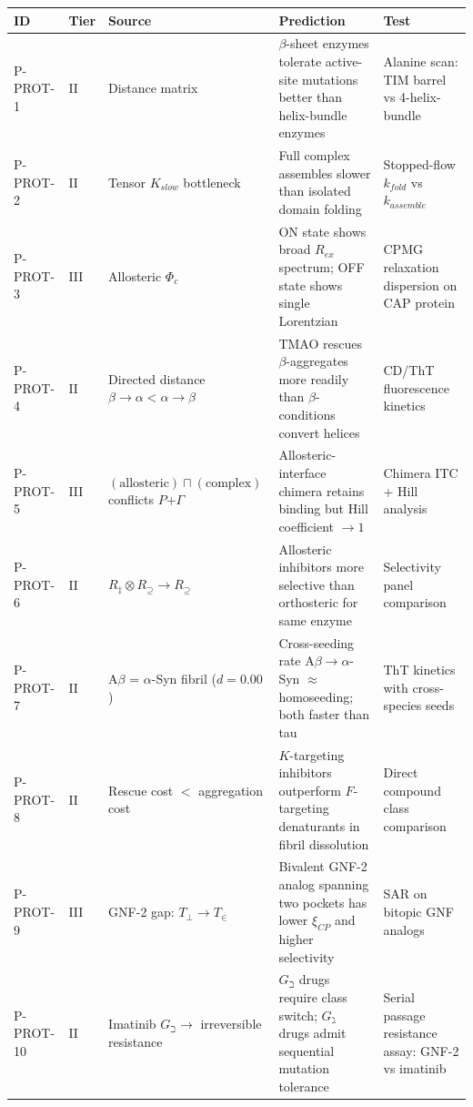 \documentclass[10pt,a4paper]{article}
\begin{document}
\begin{table}[htbp]
\centering
\small
{}
\begin{tabularx}{\textwidth}{>{\centering\arraybackslash}X >{\centering\arraybackslash}X >{\centering\arraybackslash}X >{\centering\arraybackslash}X >{\centering\arraybackslash}X}
\toprule
\rowcolor{gray!25}\textbf{ID} & \textbf{Tier} & \textbf{Source} & \textbf{Prediction} & \textbf{Test} \\
\midrule
\rowcolors{1}{white}{gray!10}
P-PROT-1 & II & Distance matrix & $\beta$-sheet enzymes tolerate active-site mutations better than helix-bundle enzymes & Alanine scan: TIM barrel vs 4-helix-bundle \\
P-PROT-2 & II & Tensor $K_{slow}$ bottleneck & Full complex assembles slower than isolated domain folding & Stopped-flow $k_{fold}$ vs $k_{assemble}$ \\
P-PROT-3 & III & Allosteric $\Phi_c$ & ON state shows broad $R_{ex}$ spectrum; OFF state shows single Lorentzian & CPMG relaxation dispersion on CAP protein \\
P-PROT-4 & II & Directed distance $\beta{\to}\alpha < \alpha{\to}\beta$ & TMAO rescues $\beta$-aggregates more readily than $\beta$-conditions convert helices & CD/ThT fluorescence kinetics \\
P-PROT-5 & III & $(\text{allosteric}) \sqcap (\text{complex})$ conflicts $P$+$\Gamma$ & Allosteric-interface chimera retains binding but Hill coefficient $\to 1$ & Chimera ITC + Hill analysis \\
P-PROT-6 & II & $R_\ddagger \otimes R_\supseteq \to R_\supseteq$ & Allosteric inhibitors more selective than orthosteric for same enzyme & Selectivity panel comparison \\
P-PROT-7 & II & A$\beta$ = $\alpha$-Syn fibril ($d = 0.00$) & Cross-seeding rate A$\beta{\to}\alpha$-Syn $\approx$ homoseeding; both faster than tau & ThT kinetics with cross-species seeds \\
P-PROT-8 & II & Rescue cost $<$ aggregation cost & $K$-targeting inhibitors outperform $F$-targeting denaturants in fibril dissolution & Direct compound class comparison \\
P-PROT-9 & III & GNF-2 gap: $T_\perp \to T_\in$ & Bivalent GNF-2 analog spanning two pockets has lower $\xi_{CP}$ and higher selectivity & SAR on bitopic GNF analogs \\
P-PROT-10 & II & Imatinib $G_\beth \to$ irreversible resistance & $G_\beth$ drugs require class switch; $G_\gimel$ drugs admit sequential mutation tolerance & Serial passage resistance assay: GNF-2 vs imatinib \\
\bottomrule
\end{tabularx}
\end{table}
\end{document}
